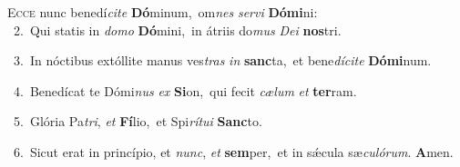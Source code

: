 \lettrine{\initial\textcolor{\initialcolor}{E}}{cce} nunc benedí\-\textit{ci}\-\textit{te} \textbf{Dó}\-minum,~\star om\textit{nes} \textit{ser}\-\textit{vi} \textbf{Dó}\-\textbf{mi}ni:\\
{\numbfont\textcolor{\numbcolor}{~2.}}~Qui statis in \textit{do}\-\textit{mo} \textbf{Dó}\-mini,~\star in átriis do\textit{mus} \textit{De}\-\textit{i} \textbf{nos}\-tri.\par
{\numbfont\textcolor{\numbcolor}{~3.}}~In nóctibus extóllite manus ves\textit{tras} \textit{in} \textbf{sanc}\-ta,~\star et bene\-\textit{dí}\-\textit{ci}\textit{te} \textbf{Dó}\-\textbf{mi}num.\par
{\numbfont\textcolor{\numbcolor}{~4.}}~Benedícat te Dómi\textit{nus} \textit{ex} \textbf{Si}\-on,~\star qui fecit \textit{cæ}\-\textit{lum} \textit{et} \textbf{ter}\-ram.\par
{\numbfont\textcolor{\numbcolor}{~5.}}~Glória Pa\-\textit{tri}\-, \textit{et} \textbf{Fí}\-lio,~\star et Spi\-\textit{rí}\-\textit{tu}\textit{i} \textbf{Sanc}\-to.\par
{\numbfont\textcolor{\numbcolor}{~6.}}~Sicut erat in princípio, et \textit{nunc}\-, \textit{et} \textbf{sem}\-per,~\star et in sǽcula sæ\-\textit{cu}\-\textit{ló}\textit{rum}. \textbf{A}\-men.\par
